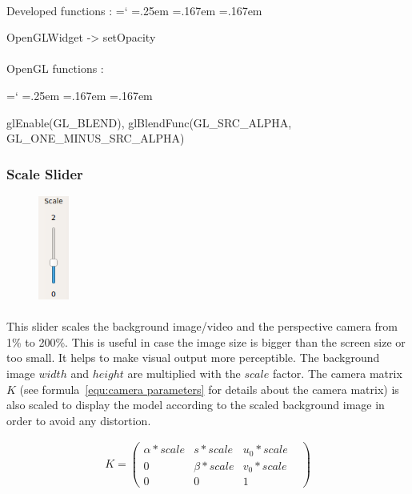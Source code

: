 \documentclass[12pt]{report}
\DeclareRobustCommand*{\ttfamily}{
  \origttfamily
  \hyphenchar\font=`\-\relax
  \fontdimen3\font=.25em\relax
  \fontdimen4\font=.167em\relax
  \fontdimen7\font=.167em\relax
}
\newenvironment{code}{\ttfamily}{}
\begin{document}
\paragraph{}
	Developed functions :
	\begin{code}
	
	 OpenGLWidget -> setOpacity
	\end{code}

\paragraph{}
	OpenGL functions :

	\begin{code}
	glEnable(GL\_BLEND), glBlendFunc(GL\_SRC\_ALPHA, GL\_ONE\_MINUS\_SRC\_ALPHA)
	\end{code}



\vspace{20pt}
\subsubsection{Scale Slider} \label{subsubsec:scale slider}

\begin{figure}
\vspace{-25pt}
\includegraphics[width=1cm]{img/scaleSlider.png}
\end{figure}
\paragraph{}
	This slider scales the background image/video and the perspective camera from 1\% to 200\%. This is useful in case the image size is bigger than the screen size or too small. It helps to make visual output more perceptible.
The background image $width$ and $height$ are multiplied with the $scale$ factor.
The camera matrix $K$ (see formula~\ref{equ:camera parameters} for details about the camera matrix) is also scaled to display the model according to the scaled background image in order to avoid any distortion.

\begin{align}
K = \begin{pmatrix}
\alpha * scale& s * scale& u_0 * scale\\
0& \beta * scale& v_0 * scale&\\
0& 0& 1
\end{pmatrix}
\end{align}
\end{document}
